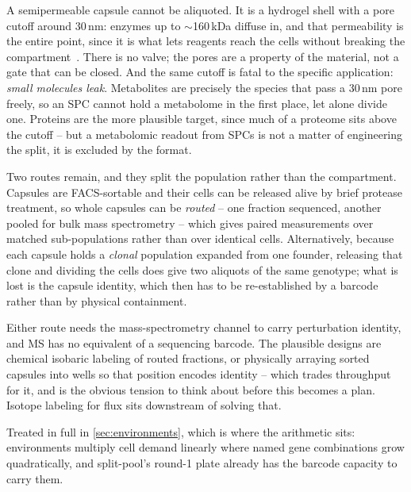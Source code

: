 A semipermeable capsule cannot be aliquoted. It is a hydrogel shell with a pore
cutoff around 30\,nm: enzymes up to $\sim$160\,kDa diffuse in, and that
permeability is the entire point, since it is what lets reagents reach the cells
without breaking the compartment~\citep{baronasHighthroughputSinglecellOmics2026}.
There is no valve; the pores are a property of the material, not a gate that can
be closed. And the same cutoff is fatal to the specific application: \emph{small
molecules leak}. Metabolites are precisely the species that pass a 30\,nm pore
freely, so an SPC cannot hold a metabolome in the first place, let alone divide
one. Proteins are the more plausible target, since much of a proteome sits above
the cutoff -- but a metabolomic readout from SPCs is not a matter of engineering
the split, it is excluded by the format.

Two routes remain, and they split the population rather than the compartment.
Capsules are FACS-sortable and their cells can be released alive by brief protease
treatment, so whole capsules can be \emph{routed} -- one fraction sequenced,
another pooled for bulk mass spectrometry -- which gives paired measurements over
matched sub-populations rather than over identical cells. Alternatively, because
each capsule holds a \emph{clonal} population expanded from one founder, releasing
that clone and dividing the cells does give two aliquots of the same genotype;
what is lost is the capsule identity, which then has to be re-established by a
barcode rather than by physical containment.

 Either route needs the mass-spectrometry channel to
carry perturbation identity, and MS has no equivalent of a sequencing barcode. The
plausible designs are chemical isobaric labeling of routed fractions, or
physically arraying sorted capsules into wells so that position encodes identity -- which trades throughput for it, and is the obvious tension to think about
before this becomes a plan. Isotope labeling for flux sits downstream of solving
that.

 Treated in full in
\cref{sec:environments}, which is where the arithmetic sits: environments
multiply cell demand linearly where named gene combinations grow quadratically,
and split-pool's round-1 plate already has the barcode capacity to carry them.
